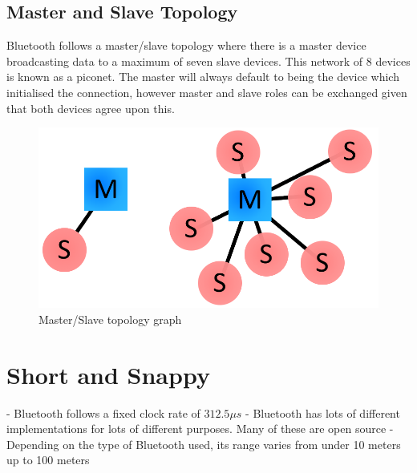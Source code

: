 \documentclass{article}
\begin{document}
	\subsection{Master and Slave Topology}
		Bluetooth follows a master/slave topology where there is a master device broadcasting data to a maximum of seven slave devices. This network of 8 devices is known as a piconet. The master will always default to being the device which initialised the connection, however master and slave roles can be exchanged given that both devices agree upon this. \newline
\begin{figure}
	\includegraphics[width=\linewidth]{master_slave_topology.png}
	\caption{Master/Slave topology graph}
\end{figure}	
	
	\section{Short and Snappy}
		- Bluetooth follows a fixed clock rate of $312.5\mu s$ \newline
		- Bluetooth has lots of different implementations for lots of different purposes. Many of these are open source \newline
		- Depending on the type of Bluetooth used, its range varies from under 10 meters up to 100 meters
	
	
\end{document}
